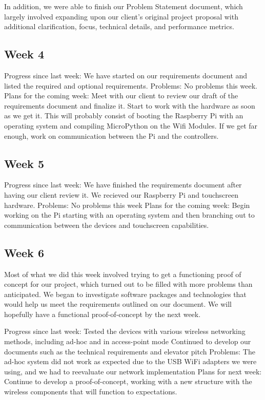 \documentclass[letterpaper,10pt]{article}
\begin{document}
In addition, we were able to finish our Problem Statement document, which
largely involved expanding upon our client's original project proposal with
additional clarification, focus, technical details, and performance metrics.

\subsection{Week 4}
 
Progress since last week: 
We have started on our requirements document and listed the required and optional requirements. 
Problems: 
No problems this week. 
Plans for the coming week: 
Meet with our client to review our draft of the requirements document and finalize it. 
Start to work with the hardware as soon as we get it. This will probably consist of booting the Raspberry Pi with an operating system and compiling MicroPython on the Wifi Modules. 
If we get far enough, work on communication between the Pi and the controllers. 

\subsection{Week 5}
 
Progress since last week: 
We have finished the requirements document after having our client review it. 
We recieved our Raspberry Pi and touchscreen hardware. 
Problems: 
No problems this week 
Plans for the coming week: 
Begin working on the Pi starting with an operating system and then branching out to communication between the devices and touchscreen capabilities. 

\subsection{Week 6}
 
Most of what we did this week involved trying to get a functioning proof of concept for our project, which turned out to be filled with more problems than anticipated. We began to investigate software packages and technologies that would help us meet the requirements outlined on our document. We will hopefully have a functional proof-of-concept by the next week. 
 
Progress since last week: 
Tested the devices with various wireless networking methods, including ad-hoc and in access-point mode 
Continued to develop our documents such as the technical requirements and elevator pitch 
Problems: 
The ad-hoc system did not work as expected due to the USB WiFi adapters we were using, and we had to reevaluate our network implementation 
Plans for next week: 
Continue to develop a proof-of-concept, working with a new structure with the wireless components that will function to expectations. 
\end{document}
